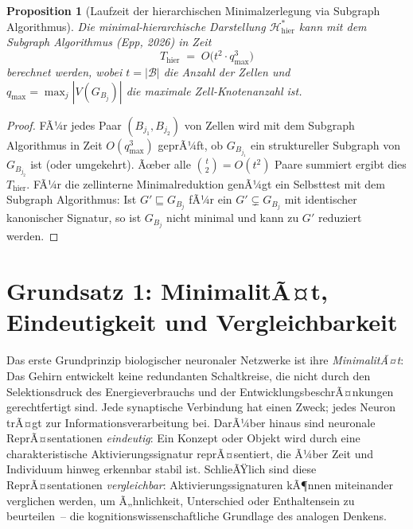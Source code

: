 ﻿\documentclass[12pt, a4paper, openany]{report}
\newtheorem{proposition}[theorem]{Proposition}
\newcommand{\calH}{\mathcal{H}}
\newcommand{\calB}{\mathcal{B}}
\begin{document}
\begin{proposition}[Laufzeit der hierarchischen Minimalzerlegung via Subgraph Algorithmus]
\label{prop:hierarchy_runtime}
Die minimal-hierarchische Darstellung $\calH^*_{\mathrm{hier}}$ kann mit dem
Subgraph Algorithmus (Epp, 2026) in Zeit
\[
  T_{\mathrm{hier}}
  \;=\;
  O\!\bigl(t^2 \cdot q_{\max}^3\bigr)
\]
berechnet werden, wobei $t = |\calB|$ die Anzahl der Zellen und
$q_{\max} = \max_j |V(G_{B_j})|$ die maximale Zell-Knotenanzahl ist.
\end{proposition}

\begin{proof}
FÃ¼r jedes Paar $(B_{j_1}, B_{j_2})$ von Zellen wird mit dem Subgraph
Algorithmus in Zeit $O(q_{\max}^3)$ geprÃ¼ft, ob $G_{B_{j_1}}$ ein
struktureller Subgraph von $G_{B_{j_2}}$ ist (oder umgekehrt).  Ãœber alle
$\binom{t}{2} = O(t^2)$ Paare summiert ergibt dies $T_{\mathrm{hier}}$.
FÃ¼r die zellinterne Minimalreduktion genÃ¼gt ein Selbsttest mit dem
Subgraph Algorithmus: Ist $G' \sqsubseteq G_{B_j}$ fÃ¼r ein $G' \subsetneq G_{B_j}$
mit identischer kanonischer Signatur, so ist $G_{B_j}$ nicht minimal und
kann zu $G'$ reduziert werden.
\end{proof}

\section{Grundsatz 1: MinimalitÃ¤t, Eindeutigkeit und Vergleichbarkeit}
\label{sec:bio_minimal}

Das erste Grundprinzip biologischer neuronaler Netzwerke ist ihre
\emph{MinimalitÃ¤t}: Das Gehirn entwickelt keine redundanten Schaltkreise,
die nicht durch den Selektionsdruck des Energieverbrauchs und der
EntwicklungsbeschrÃ¤nkungen gerechtfertigt sind.  Jede synaptische Verbindung
hat einen Zweck; jedes Neuron trÃ¤gt zur Informationsverarbeitung bei.  DarÃ¼ber
hinaus sind neuronale ReprÃ¤sentationen \emph{eindeutig}: Ein Konzept oder Objekt
wird durch eine charakteristische Aktivierungssignatur reprÃ¤sentiert, die
Ã¼ber Zeit und Individuum hinweg erkennbar stabil ist.  SchlieÃŸlich sind diese
ReprÃ¤sentationen \emph{vergleichbar}: Aktivierungssignaturen kÃ¶nnen
miteinander verglichen werden, um Ã„hnlichkeit, Unterschied oder
Enthaltensein zu beurteilen~-- die kognitionswissenschaftliche Grundlage
des analogen Denkens.
\end{document}
